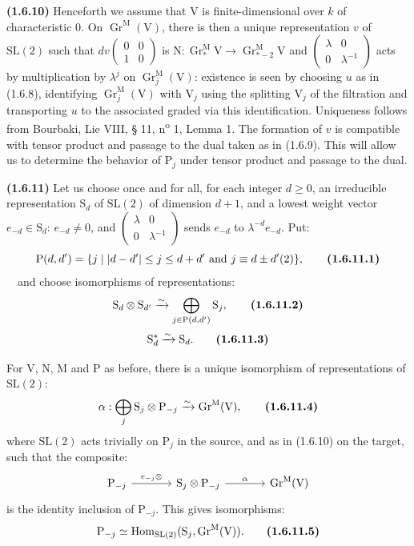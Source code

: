\documentclass[11pt,leqno]{article}
\newcommand{\Page}[1]{\ifvmode\noindent\else\unskip\ \fi{\footnotesize\textcolor{gray}{[p.\,#1]}}\ \ignorespaces}
\begin{document}
\textbf{(1.6.10)} Henceforth we assume that \(\mathrm{V}\) is finite-dimensional over \(k\) of characteristic \(0\). On \(\operatorname{Gr}^{\mathrm{M}}(\mathrm{V})\), there is then a unique representation \(v\) of \(\mathrm{SL}(2)\) such that \(dv\begin{pmatrix}0&0\\1&0\end{pmatrix}\) is \(\mathrm{N}:\operatorname{Gr}_*^{\mathrm{M}}\mathrm{V}\to\operatorname{Gr}_{*-2}^{\mathrm{M}}\mathrm{V}\) and \(\begin{pmatrix}\lambda&0\\0&\lambda^{-1}\end{pmatrix}\) acts by multiplication by \(\lambda^j\) on \(\operatorname{Gr}_j^{\mathrm{M}}(\mathrm{V})\): existence is seen by choosing \(u\) as in (1.6.8), identifying \(\operatorname{Gr}_j^{\mathrm{M}}(\mathrm{V})\) with \(\mathrm{V}_j\) using the splitting \(\mathrm{V}_j\) of the filtration and transporting \(u\) to the associated graded via this identification. Uniqueness follows from Bourbaki, Lie VIII, § 11, n\textsuperscript{o} 1, Lemma 1. The formation of \(v\) is compatible with tensor product and passage to the dual taken as in (1.6.9). This will allow us to determine the behavior of \(\mathrm{P}_j\) under tensor product and passage to the dual.

\textbf{(1.6.11)} Let us choose once and for all, for each integer \(d\ge0\), an irreducible representation \(\mathrm{S}_d\) of \(\mathrm{SL}(2)\) of dimension \(d+1\), and a lowest weight vector \(e_{-d}\in\mathrm{S}_d\): \(e_{-d}\ne0\), and \(\begin{pmatrix}\lambda&0\\0&\lambda^{-1}\end{pmatrix}\) sends \(e_{-d}\) to \(\lambda^{-d}e_{-d}\). Put:
\[
\mathrm{P}(d,d')=\{j\mid |d-d'|\le j\le d+d'\text{ and }j\equiv d\pm d'(2)\},
\tag*{\textbf{(1.6.11.1)}}
\]
\Page{168}and choose isomorphisms of representations:
\[
\mathrm{S}_d\otimes\mathrm{S}_{d'}
\xrightarrow{\sim}
\bigoplus_{j\in\mathrm{P}(d,d')}\mathrm{S}_j,
\tag*{\textbf{(1.6.11.2)}}
\]
\[
\mathrm{S}_d^*\xrightarrow{\sim}\mathrm{S}_d.
\tag*{\textbf{(1.6.11.3)}}
\]

For \(\mathrm{V}\), \(\mathrm{N}\), \(\mathrm{M}\) and \(\mathrm{P}\) as before, there is a unique isomorphism of representations of \(\mathrm{SL}(2)\):
\[
\alpha:\bigoplus_j\mathrm{S}_j\otimes\mathrm{P}_{-j}
\xrightarrow{\sim}\operatorname{Gr}^{\mathrm{M}}(\mathrm{V}),
\tag*{\textbf{(1.6.11.4)}}
\]
where \(\mathrm{SL}(2)\) acts trivially on \(\mathrm{P}_j\) in the source, and as in (1.6.10) on the target, such that the composite:
\[
\begin{tikzcd}[ampersand replacement=\&,column sep=large]
\mathrm{P}_{-j}
  \arrow[r,"{e_{-j}\otimes}"]
  \& \mathrm{S}_j\otimes\mathrm{P}_{-j}
  \arrow[r,"\alpha"]
  \& \operatorname{Gr}^{\mathrm{M}}(\mathrm{V})
\end{tikzcd}
\]
is the identity inclusion of \(\mathrm{P}_{-j}\). This gives isomorphisms:
\[
\mathrm{P}_{-j}\simeq
\operatorname{Hom}_{\mathrm{SL}(2)}
(\mathrm{S}_j,\operatorname{Gr}^{\mathrm{M}}(\mathrm{V})).
\tag*{\textbf{(1.6.11.5)}}
\]
\end{document}
